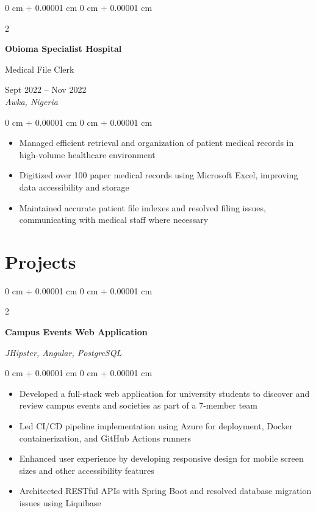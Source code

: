 \documentclass[10pt, a4paper]{article}
\newenvironment{highlights}{
    \begin{itemize}[
        topsep=0.10 cm,
        parsep=0.10 cm,
        partopsep=0pt,
        itemsep=0pt,
        leftmargin=20pt
    ]
}{
    \end{itemize}
} %
\newenvironment{onecolentry}{
    \begin{adjustwidth}{
        0 cm + 0.00001 cm
    }{
        0 cm + 0.00001 cm
    }
}{
    \end{adjustwidth}
} %
\newenvironment{twocolentry}[2][]{
    \onecolentry
    \def\secondColumn{#2}
    \setcolumnwidth{\fill, 4.5 cm}
    \begin{paracol}{2}
}{
    \switchcolumn \raggedleft \secondColumn
    \end{paracol}
    \endonecolentry
} %
\begin{document}
    \vspace{0.15 cm}

    \begin{twocolentry}{
        Sept 2022 -- Nov 2022 \\
        \textit{Awka, Nigeria}
    }
        \textbf{Obioma Specialist Hospital}
        
        Medical File Clerk
    \end{twocolentry}

    \vspace{0.10 cm}
    \begin{onecolentry}
        \begin{highlights}
            \item Managed efficient retrieval and organization of patient medical records in high-volume healthcare environment
            \item Digitized over 100 paper medical records using Microsoft Excel, improving data accessibility and storage
            \item Maintained accurate patient file indexes and resolved filing issues, communicating with medical staff where necessary
        \end{highlights}
    \end{onecolentry}

    \vspace{0.15 cm}

    \section{Projects}


    \begin{twocolentry}{
        \textit{JHipster, Angular, PostgreSQL}
    }
        \textbf{Campus Events Web Application}
    \end{twocolentry}

    \vspace{0.10 cm}
    \begin{onecolentry}
        \begin{highlights}
            \item Developed a full-stack web application for university students to discover and review campus events and societies as part of a 7-member team
            \item Led CI/CD pipeline implementation using Azure for deployment, Docker containerization, and GitHub Actions runners
            \item Enhanced user experience by developing responsive design for mobile screen sizes and other accessibility features
            \item Architected RESTful APIs with Spring Boot and resolved database migration issues using Liquibase
        \end{highlights}
    \end{onecolentry}
\end{document}
